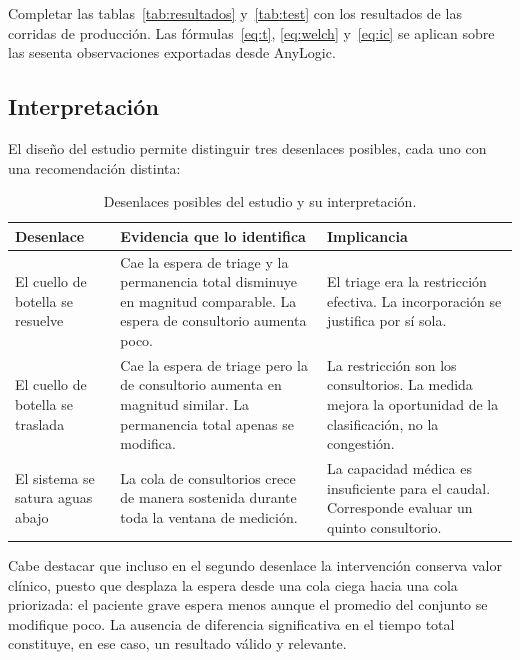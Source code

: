 \begin{pendiente}
Completar las tablas~\ref{tab:resultados} y~\ref{tab:test} con los resultados
de las corridas de producción. Las fórmulas~\eqref{eq:t},
\eqref{eq:welch} y~\eqref{eq:ic} se aplican sobre las sesenta observaciones
exportadas desde AnyLogic.
\end{pendiente}

\subsection{Interpretación}

El diseño del estudio permite distinguir tres desenlaces posibles, cada uno
con una recomendación distinta:

\begin{table}[H]
\centering
\small
\begin{tabular}{p{3.6cm}p{5.0cm}p{5.0cm}}
\toprule
\textbf{Desenlace} & \textbf{Evidencia que lo identifica} & \textbf{Implicancia} \\
\midrule
El cuello de botella se resuelve &
Cae la espera de triage y la permanencia total disminuye en magnitud
comparable. La espera de consultorio aumenta poco. &
El triage era la restricción efectiva. La incorporación se justifica por sí
sola. \\
El cuello de botella se traslada &
Cae la espera de triage pero la de consultorio aumenta en magnitud similar.
La permanencia total apenas se modifica. &
La restricción son los consultorios. La medida mejora la oportunidad de la
clasificación, no la congestión. \\
El sistema se satura aguas abajo &
La cola de consultorios crece de manera sostenida durante toda la ventana de
medición. &
La capacidad médica es insuficiente para el caudal. Corresponde evaluar un
quinto consultorio. \\
\bottomrule
\end{tabular}
\caption{Desenlaces posibles del estudio y su interpretación.}
\end{table}

Cabe destacar que incluso en el segundo desenlace la intervención conserva
valor clínico, puesto que desplaza la espera desde una cola ciega hacia una
cola priorizada: el paciente grave espera menos aunque el promedio del
conjunto se modifique poco. La ausencia de diferencia significativa en el
tiempo total constituye, en ese caso, un resultado válido y relevante.

